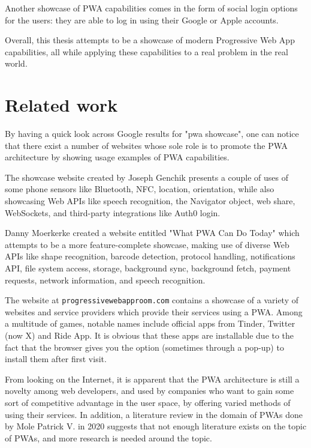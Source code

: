 Another showcase of PWA capabilities comes in the form of social login options for the users: they are able to log in using their Google or Apple accounts.

Overall, this thesis attempts to be a showcase of modern Progressive Web App capabilities, all while applying these capabilities to a real problem in the real world.

\section{Related work}

By having a quick look across Google results for "pwa showcase", one can notice that there exist a number of websites whose sole role is to promote the PWA architecture by showing usage examples of PWA capabilities.

The showcase website created by Joseph Genchik \cite{GenchikPWAShowcase} presents a couple of uses of some phone sensors like Bluetooth, NFC, location, orientation, while also showcasing Web APIs like speech recognition, the Navigator object, web share, WebSockets, and third-party integrations like Auth0 login.

Danny Moerkerke created a website entitled "What PWA Can Do Today" \cite{MoerkerkePWAShowcase} which attempts to be a more feature-complete showcase, making use of diverse Web APIs like shape recognition, barcode detection, protocol handling, notifications API, file system access, storage, background sync, background fetch, payment requests, network information, and speech recognition.

The website at \verb|progressivewebapproom.com| \cite{PWARoom} contains a showcase of a variety of websites and service providers which provide their services using a PWA. Among a multitude of games, notable names include official apps from Tinder, Twitter (now X) and Ride App. It is obvious that these apps are installable due to the fact that the browser gives you the option (sometimes through a pop-up) to install them after first visit.

From looking on the Internet, it is apparent that the PWA architecture is still a novelty among web developers, and used by companies who want to gain some sort of competitive advantage in the user space, by offering varied methods of using their services. In addition, a literature review in the domain of PWAs done by Mole Patrick V. in 2020 \cite{MoleLitRev} suggests that not enough literature exists on the topic of PWAs, and more research is needed around the topic.
